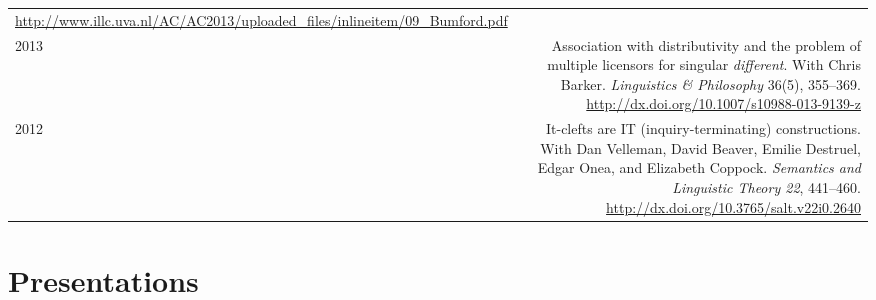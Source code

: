 \documentclass[12pt]{article}
\newcommand{\doi}[1]{\url{http://dx.doi.org/#1}}
\newcommand{\refmark}{\textcolor{gray}{\textdagger}}
\begin{document}
\begin{longtable}{LR}
          \url{http://www.illc.uva.nl/AC/AC2013/uploaded_files/inlineitem/09_Bumford.pdf}\\
  2013  & Association with distributivity and the problem of multiple
          licensors for singular \textit{different}.\newline
          With Chris Barker.\newline
          \textit{Linguistics \& Philosophy} 36(5), 355--369.\newline
          \doi{10.1007/s10988-013-9139-z}\\ %
  2012  & It-clefts are IT (inquiry-terminating) constructions.\newline
          With Dan Velleman, David Beaver, Emilie Destruel, Edgar Onea, and
          Elizabeth Coppock.\newline
          \textit{Semantics and Linguistic Theory 22}, 441--460.\newline
          \doi{10.3765/salt.v22i0.2640}
\end{longtable}
\endgroup

\medskip

\section*{Presentations}
\end{document}
